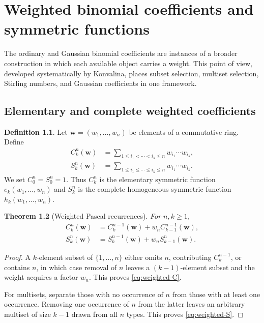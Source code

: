 \documentclass[11pt,oneside,openany]{book}
\newtheorem{theorem}{Theorem}[chapter]
\theoremstyle{definition}
\newtheorem{definition}[theorem]{Definition}
\theoremstyle{remark}
\begin{document}
\chapter{Weighted binomial coefficients and symmetric functions}\label{chap:weighted}

The ordinary and Gaussian binomial coefficients are instances of a broader construction in which each available object carries a weight.  This point of view, developed systematically by Konvalina, places subset selection, multiset selection, Stirling numbers, and Gaussian coefficients in one framework.

\section{Elementary and complete weighted coefficients}

\begin{definition}
Let $\mathbf w=(w_1,\dots,w_n)$ be elements of a commutative ring.  Define
\begin{align*}
 C_k^n(\mathbf w)
 &=\sum_{1\le i_1<\cdots<i_k\le n}w_{i_1}\cdots w_{i_k},\\
 S_k^n(\mathbf w)
 &=\sum_{1\le i_1\le\cdots\le i_k\le n}w_{i_1}\cdots w_{i_k}.
\end{align*}
We set $C_0^n=S_0^n=1$.  Thus $C_k^n$ is the elementary symmetric function $e_k(w_1,\dots,w_n)$ and $S_k^n$ is the complete homogeneous symmetric function $h_k(w_1,\dots,w_n)$.
\end{definition}

\begin{theorem}[Weighted Pascal recurrences]\label{thm:weighted-pascal}
For $n,k\ge1$,
\begin{align}
 C_k^n(\mathbf w)&=C_k^{n-1}(\mathbf w)+w_nC_{k-1}^{n-1}(\mathbf w),\label{eq:weighted-C}\\
 S_k^n(\mathbf w)&=S_k^{n-1}(\mathbf w)+w_nS_{k-1}^{n}(\mathbf w).\label{eq:weighted-S}
\end{align}
\end{theorem}

\begin{proof}
A $k$-element subset of $\{1,\dots,n\}$ either omits $n$, contributing $C_k^{n-1}$, or contains $n$, in which case removal of $n$ leaves a $(k-1)$-element subset and the weight acquires a factor $w_n$.  This proves \eqref{eq:weighted-C}.

For multisets, separate those with no occurrence of $n$ from those with at least one occurrence.  Removing one occurrence of $n$ from the latter leaves an arbitrary multiset of size $k-1$ drawn from all $n$ types.  This proves \eqref{eq:weighted-S}.
\end{proof}
\end{document}
